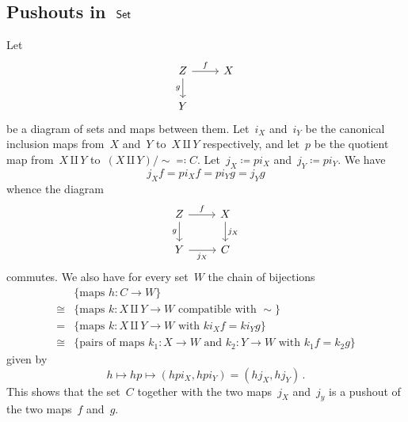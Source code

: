 \subsection{Pushouts in~\texorpdfstring{$\mathsf{Set}$}{Set}}

Let
\[
	\begin{tikzcd}
		Z
		\arrow{r}[above]{f}
		\arrow{d}[left]{g}
		&
		X
		\\
		Y
		&
		{}
	\end{tikzcd}
\]
be a diagram of sets and maps between them.
Let~$i_X$ and~$i_Y$ be the canonical inclusion maps from~$X$ and~$Y$ to~$X ⨿ Y$ respectively, and let~$p$ be the quotient map from~$X ⨿ Y$ to~$(X ⨿ Y) / {∼} ≕ C$.
Let~$j_X ≔ p i_X$ and~$j_Y ≔ p i_Y$.
We have
\[
	j_X f = p i_X f = p i_Y g = j_Y g
\]
whence the diagram
\[
	\begin{tikzcd}
		Z
		\arrow{r}[above]{f}
		\arrow{d}[left]{g}
		&
		X
		\arrow{d}[right]{j_X}
		\\
		Y
		\arrow{r}[below]{j_X}
		&
		C
	\end{tikzcd}
\]
commutes.
We also have for every set~$W$ the chain of bijections
\begin{align*}
	{}&
	\{ \textstyle\text{maps~$h \colon C \to W$} \} \\
	≅{}&
	\{ \textstyle\text{maps~$k \colon X ⨿ Y \to W$ compatible with~$∼$} \} \\
	={}&
	\{ \textstyle\text{maps~$k \colon X ⨿ Y \to W$ with~$k i_X f = k i_Y g$} \} \\
	≅{}&
	\{ \textstyle\text{pairs of maps~$k_1 \colon X \to W$ and~$k_2 \colon Y \to W$ with~$k_1 f = k_2 g$} \}
\end{align*}
given by
\[
	h \mapsto h p \mapsto (h p i_X, h p i_Y) = (h j_X, h j_Y) \,.
\]
This shows that the set~$C$ together with the two maps~$j_X$ and~$j_y$ is a pushout of the two maps~$f$ and~$g$.
